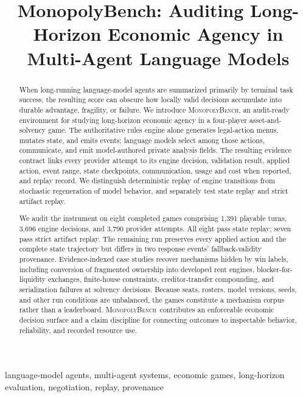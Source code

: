 \documentclass[conference]{IEEEtran}
\newcommand{\Bench}{\textsc{MonopolyBench}}
\begin{document}
\title{MonopolyBench: Auditing Long-Horizon Economic Agency in Multi-Agent Language Models}

\author{}

\maketitle

\begin{abstract}
When long-running language-model agents are summarized primarily by terminal
task success, the resulting score can obscure how locally valid decisions
accumulate into durable advantage, fragility, or failure. We introduce
\Bench, an audit-ready
environment for studying long-horizon economic agency in a four-player
asset-and-solvency game. The authoritative rules engine alone generates
legal-action menus, mutates state, and emits events; language models select
among those actions, communicate, and emit model-authored private analysis
fields. The
resulting evidence contract links every provider attempt to its engine
decision, validation result, applied action, event range, state checkpoints,
communication, usage and cost when reported, and replay record. We distinguish
deterministic replay of engine transitions from stochastic regeneration of
model behavior, and separately test state replay and strict artifact replay.

We audit the instrument on eight completed games comprising 1,391 playable
turns, 3,696 engine decisions, and 3,790 provider attempts. All eight pass state
replay; seven pass strict artifact replay. The remaining run preserves every
applied action and the complete state trajectory but differs in two response
events' fallback-validity provenance. Evidence-indexed case studies recover mechanisms
hidden by win labels, including conversion of fragmented ownership into
developed rent engines, blocker-for-liquidity exchanges, finite-house
constraints, creditor-transfer compounding, and serialization failures at
solvency decisions. Because seats, rosters, model versions, seeds, and other
run conditions are unbalanced, the games constitute a mechanism corpus rather than a
leaderboard. \Bench\ contributes an enforceable economic decision surface and
a claim discipline for connecting outcomes to inspectable behavior,
reliability, and recorded resource use.
\end{abstract}

\begin{IEEEkeywords}
language-model agents, multi-agent systems, economic games, long-horizon
evaluation, negotiation, replay, provenance
\end{IEEEkeywords}
\end{document}
